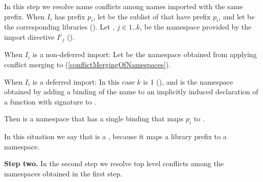 \documentclass[makeidx]{article}
\begin{document}
{
\EndCase

\LMHash{}%
In this step we resolve name conflicts
among names imported with the same prefix.
When $I_i$ has prefix $p_i$,
let  be the sublist of  that have prefix $p_i$,
and let  be the corresponding libraries
().
Let , $j \in 1 .. k$,
be the namespace provided by the import directive $I'_j$
().

\LMHash{}%
When $I_i$ is a non-deferred import:
Let  be the namespace obtained from applying
conflict merging to
(\ref{conflictMergingOfNamespaces}).

\LMHash{}%
When $I_i$ is a deferred import:
In this case $k$ is 1
(),
and  is the namespace obtained by
adding a binding of the name 
to an implicitly induced declaration of a function with signature
to .

\LMHash{}%
Then  is a namespace that has
a single binding that maps $p_i$ to .

\LMHash{}%
In this situation we say that  is a
,
because it maps a library prefix to a namespace.

\EndCase

\LMHash{}%
{\bf Step two.}
In the second step we resolve top level conflicts
among the namespaces obtained in the first step.

}
\end{document}
